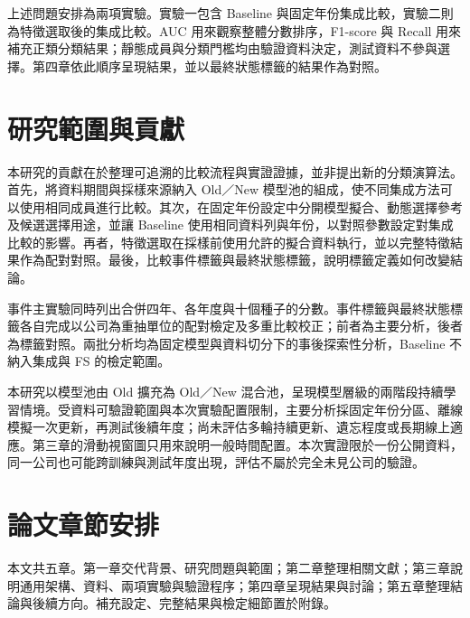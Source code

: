 上述問題安排為兩項實驗。實驗一包含 Baseline 與固定年份集成比較，實驗二則為特徵選取後的集成比較。AUC 用來觀察整體分數排序，F1-score 與 Recall 用來補充正類分類結果；靜態成員與分類門檻均由驗證資料決定，測試資料不參與選擇。第四章依此順序呈現結果，並以最終狀態標籤的結果作為對照。

\section{研究範圍與貢獻}

本研究的貢獻在於整理可追溯的比較流程與實證證據，並非提出新的分類演算法。首先，將資料期間與採樣來源納入 Old／New 模型池的組成，使不同集成方法可以使用相同成員進行比較。其次，在固定年份設定中分開模型擬合、動態選擇參考及候選選擇用途，並讓 Baseline 使用相同資料列與年份，以對照參數設定對集成比較的影響。再者，特徵選取在採樣前使用允許的擬合資料執行，並以完整特徵結果作為配對對照。最後，比較事件標籤與最終狀態標籤，說明標籤定義如何改變結論。

事件主實驗同時列出合併四年、各年度與十個種子的分數。事件標籤與最終狀態標籤各自完成以公司為重抽單位的配對檢定及多重比較校正；前者為主要分析，後者為標籤對照。兩批分析均為固定模型與資料切分下的事後探索性分析，Baseline 不納入集成與 FS 的檢定範圍。

本研究以模型池由 Old 擴充為 Old／New 混合池，呈現模型層級的兩階段持續學習情境。受資料可驗證範圍與本次實驗配置限制，主要分析採固定年份分區、離線模擬一次更新，再測試後續年度；尚未評估多輪持續更新、遺忘程度或長期線上適應。第三章的滑動視窗圖只用來說明一般時間配置。本次實證限於一份公開資料，同一公司也可能跨訓練與測試年度出現，評估不屬於完全未見公司的驗證。

\section{論文章節安排}

本文共五章。第一章交代背景、研究問題與範圍；第二章整理相關文獻；第三章說明通用架構、資料、兩項實驗與驗證程序；第四章呈現結果與討論；第五章整理結論與後續方向。補充設定、完整結果與檢定細節置於附錄。
\endgroup
